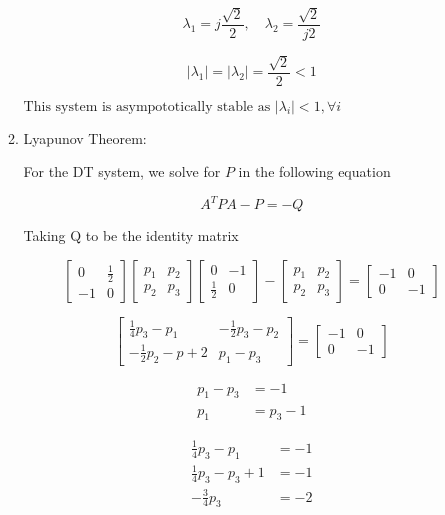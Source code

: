 \documentclass{article}
\begin{document}
\begin{enumerate}[label=\alph*)]
\begin{enumerate}[label=\roman*)]
        \[\lambda_1 = j\frac{\sqrt{2}}{2}, \quad \lambda_2 = \frac{\sqrt{2}}{j2}\]

        \[ |\lambda_1| = |\lambda_2| = \frac{\sqrt{2}}{2} < 1\]

        $\boxed{\text{This system is asympototically stable as $|\lambda_i| < 1, \forall i$}}$

    \item Lyapunov Theorem:
    
    For the DT system, we solve for $P$ in the following equation

    \[A^T P A - P = -Q\]

    Taking Q to be the identity matrix

    \[
    \begin{bmatrix}
        0 & \frac{1}{2} \\
        -1 & 0
    \end{bmatrix}
    \begin{bmatrix}
        p_1 & p_2 \\
        p_2 & p_3
    \end{bmatrix}
    \begin{bmatrix}
        0 & -1 \\
        \frac{1}{2} & 0
    \end{bmatrix}
    -
    \begin{bmatrix}
        p_1 & p_2 \\
        p_2 & p_3
    \end{bmatrix}
    = 
    \begin{bmatrix}
        -1 & 0 \\
        0 & -1
    \end{bmatrix}
    \]

    \[
    \begin{bmatrix}
        \frac{1}{4}p_3 - p_1 & -\frac{1}{2}p_3 - p_2 \\
        -\frac{1}{2}p_2 - p+2 & p_1 - p_3
    \end{bmatrix}
    =
    \begin{bmatrix}
        -1 & 0 \\
        0 & -1
    \end{bmatrix}
    \]

    \begin{align*}
        p_1 - p_3 &= -1 \\
        p_1 &= p_3 - 1
    \end{align*}

    \begin{align*}
        \frac{1}{4}p_3 - p_1 &= -1 \\
        \frac{1}{4}p_3 - p_3 + 1 &= -1 \\
        -\frac{3}{4}p_3 &= -2
    \end{align*}


\end{enumerate}
\end{enumerate}
\end{document}

